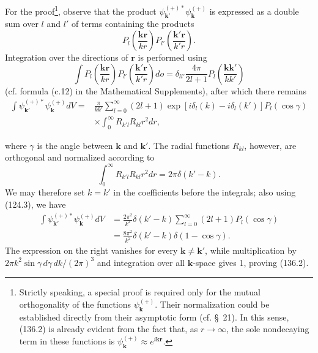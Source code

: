 For the proof\footnote{Strictly speaking, a special proof is required only for the mutual orthogonality of the functions $\psi_{\mathbf k}^{(+)}$. Their normalization could be established directly from their asymptotic form (cf. \S~21). In this sense, (136.2) is already evident from the fact that, as $r\to\infty$, the sole nondecaying term in these functions is $\psi_{\mathbf k}^{(+)}\approx e^{i\mathbf{kr}}$.}, observe that the product $\psi_{\mathbf k'}^{(+)*}\psi_{\mathbf k}^{(+)}$ is expressed as a double sum over $l$ and $l'$ of terms containing the products
\[
 P_l\left(\frac{\mathbf{kr}}{kr}\right)P_{l'}\left(\frac{\mathbf{k'r}}{k'r}\right).
\]
Integration over the directions of $\mathbf r$ is performed using
\begin{equation}
 \int P_l\left(\frac{\mathbf{kr}}{kr}\right)P_{l'}\left(\frac{\mathbf{k'r}}{k'r}\right)d o
 =\delta_{ll'}\frac{4\pi}{2l+1}P_l\left(\frac{\mathbf{kk'}}{kk'}\right)
 \tag{136.3}
\end{equation}
(cf. formula (c.12) in the Mathematical Supplements), after which there remains
\begin{align*}
 \int\psi_{\mathbf k'}^{(+)*}\psi_{\mathbf k}^{(+)}dV
 ={}&\frac{\pi}{kk'}\sum_{l=0}^{\infty}(2l+1)
 \exp[i\delta_l(k)-i\delta_l(k')]P_l(\cos\gamma)\\
 &\times\int_0^\infty R_{k'l}R_{kl}r^2dr,
\end{align*}

where $\gamma$ is the angle between $\mathbf k$ and $\mathbf k'$. The radial functions $R_{kl}$, however, are orthogonal and normalized according to
\[
 \int_0^\infty R_{k'l}R_{kl}r^2dr=2\pi\delta(k'-k).
\]
We may therefore set $k=k'$ in the coefficients before the integrals; also using (124.3), we have
\begin{align*}
 \int\psi_{\mathbf k'}^{(+)*}\psi_{\mathbf k}^{(+)}dV
 &=\frac{2\pi^2}{k^2}\delta(k'-k)
 \sum_{l=0}^{\infty}(2l+1)P_l(\cos\gamma)\\
 &=\frac{8\pi^2}{k^2}\delta(k'-k)\delta(1-\cos\gamma).
\end{align*}
The expression on the right vanishes for every $\mathbf k\ne\mathbf k'$, while multiplication by $2\pi k^2\sin\gamma\,d\gamma\,dk/(2\pi)^3$ and integration over all $\mathbf k$-space gives 1, proving (136.2).

